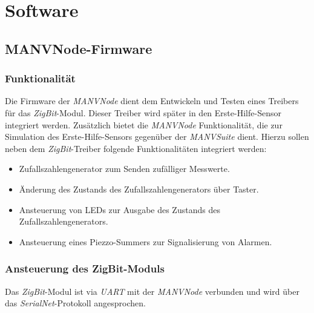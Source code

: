 \section{Software}
\subsection{MANVNode-Firmware}

\subsubsection{Funktionalität}
Die Firmware der \emph{MANVNode} dient dem Entwickeln und Testen eines Treibers für das \emph{ZigBit}-Modul. Dieser
Treiber wird später in den Erste-Hilfe-Sensor integriert werden. Zusätzlich bietet die \emph{MANVNode} Funktionalität,
die zur Simulation des Erste-Hilfe-Sensors gegenüber der \emph{MANVSuite} dient. Hierzu sollen neben dem 
\emph{ZigBit}-Treiber folgende Funktionalitäten integriert werden:

\begin{itemize}
    \item Zufallszahlengenerator zum Senden zufälliger Messwerte.
    \item Änderung des Zustands des Zufallszahlengenerators über Taster.
    \item Ansteuerung von LEDs zur Ausgabe des Zustands des Zufallszahlengenerators.
    \item Ansteuerung eines Piezzo-Summers zur Signalisierung von Alarmen.
\end{itemize}


\subsubsection{Ansteuerung des ZigBit-Moduls}
Das \emph{ZigBit}-Modul ist via \emph{UART} mit der \emph{MANVNode} verbunden und wird über das \emph{SerialNet}-Protokoll
angesprochen.

